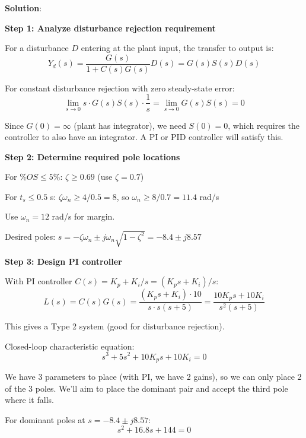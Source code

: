\textbf{Solution}:

\textbf{Step 1: Analyze disturbance rejection requirement}

For a disturbance $D$ entering at the plant input, the transfer to output is:
\begin{equation}
    Y_d(s) = \frac{G(s)}{1 + C(s)G(s)} D(s) = G(s) S(s) D(s)
\end{equation}

For constant disturbance rejection with zero steady-state error:
\begin{equation}
    \lim_{s \to 0} s \cdot G(s) S(s) \cdot \frac{1}{s} = \lim_{s \to 0} G(s) S(s) = 0
\end{equation}

Since $G(0) = \infty$ (plant has integrator), we need $S(0) = 0$, which requires the controller to also have an integrator. A PI or PID controller will satisfy this.

\textbf{Step 2: Determine required pole locations}

For $\%OS \leq 5\%$: $\zeta \geq 0.69$ (use $\zeta = 0.7$)

For $t_s \leq 0.5$ s: $\zeta\omega_n \geq 4/0.5 = 8$, so $\omega_n \geq 8/0.7 = 11.4$ rad/s

Use $\omega_n = 12$ rad/s for margin.

Desired poles: $s = -\zeta\omega_n \pm j\omega_n\sqrt{1-\zeta^2} = -8.4 \pm j8.57$

\textbf{Step 3: Design PI controller}

With PI controller $C(s) = K_p + K_i/s = (K_p s + K_i)/s$:
\begin{equation}
    L(s) = C(s)G(s) = \frac{(K_p s + K_i) \cdot 10}{s \cdot s(s+5)} = \frac{10K_p s + 10K_i}{s^2(s+5)}
\end{equation}

This gives a Type 2 system (good for disturbance rejection).

Closed-loop characteristic equation:
\begin{equation}
    s^3 + 5s^2 + 10K_p s + 10K_i = 0
\end{equation}

We have 3 parameters to place (with PI, we have 2 gains), so we can only place 2 of the 3 poles. We'll aim to place the dominant pair and accept the third pole where it falls.

For dominant poles at $s = -8.4 \pm j8.57$:
\begin{equation}
    s^2 + 16.8s + 144 = 0
\end{equation}

